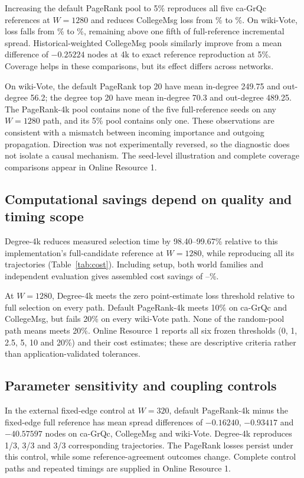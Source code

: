\documentclass[smallextended]{svjour3}
\begin{document}
Increasing the default PageRank pool to 5\% reproduces all five ca-GrQc references at $W=1280$ and reduces CollegeMsg loss from \CollegePRLoss{}\% to \CollegePRfiveLoss{}\%. On wiki-Vote, loss falls from \WikiPRLoss{}\% to \WikiPRfiveLoss{}\%, remaining above one fifth of full-reference incremental spread. Historical-weighted CollegeMsg pools similarly improve from a mean difference of $-0.25224$ nodes at 4k to exact reference reproduction at 5\%. Coverage helps in these comparisons, but its effect differs across networks.

On wiki-Vote, the default PageRank top 20 have mean in-degree 249.75 and out-degree 56.2; the degree top 20 have mean in-degree 70.3 and out-degree 489.25. The PageRank-4k pool contains none of the five full-reference seeds on any $W=1280$ path, and its 5\% pool contains only one. These observations are consistent with a mismatch between incoming importance and outgoing propagation. Direction was not experimentally reversed, so the diagnostic does not isolate a causal mechanism. The seed-level illustration and complete coverage comparisons appear in Online Resource 1.

\subsection{Computational savings depend on quality and timing scope}
Degree-4k reduces measured selection time by 98.40--99.67\% relative to this implementation's full-candidate reference at $W=1280$, while reproducing all its trajectories (Table~\ref{tab:cost}). Including setup, both world families and independent evaluation gives assembled cost savings of \CollegeDegreeSaving{}--\WikiDegreeSaving{}\%.


At $W=1280$, Degree-4k meets the zero point-estimate loss threshold relative to full selection on every path. Default PageRank-4k meets 10\% on ca-GrQc and CollegeMsg, but fails 20\% on every wiki-Vote path. None of the random-pool path means meets 20\%. Online Resource 1 reports all six frozen thresholds (0, 1, 2.5, 5, 10 and 20\%) and their cost estimates; these are descriptive criteria rather than application-validated tolerances.

\subsection{Parameter sensitivity and coupling controls}

In the external fixed-edge control at $W=320$, default PageRank-4k minus the fixed-edge full reference has mean spread differences of $-0.16240$, $-0.93417$ and $-40.57597$ nodes on ca-GrQc, CollegeMsg and wiki-Vote. Degree-4k reproduces 1/3, 3/3 and 3/3 corresponding trajectories. The PageRank losses persist under this control, while some reference-agreement outcomes change. Complete control paths and repeated timings are supplied in Online Resource 1.
\end{document}
